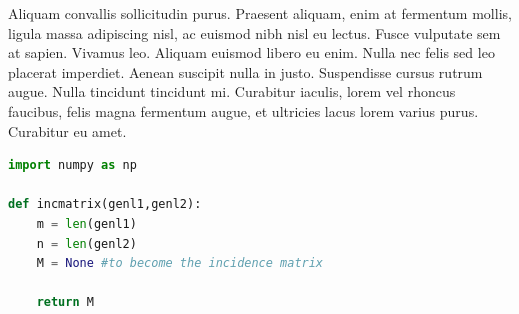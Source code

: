 \documentclass[twoside]{report}
\begin{document}
Aliquam convallis sollicitudin purus. Praesent aliquam, enim at fermentum mollis, ligula massa adipiscing nisl, ac euismod nibh nisl eu lectus. Fusce vulputate sem at sapien. Vivamus leo. Aliquam euismod libero eu enim. Nulla nec felis sed leo placerat imperdiet. Aenean suscipit nulla in justo. Suspendisse cursus rutrum augue. Nulla tincidunt tincidunt mi. Curabitur iaculis, lorem vel rhoncus faucibus, felis magna fermentum augue, et ultricies lacus lorem varius purus. Curabitur eu amet.\\

\begin{lstlisting}[language=Python]
import numpy as np
    
def incmatrix(genl1,genl2):
    m = len(genl1)
    n = len(genl2)
    M = None #to become the incidence matrix
    
    return M
\end{lstlisting}
\end{document}
